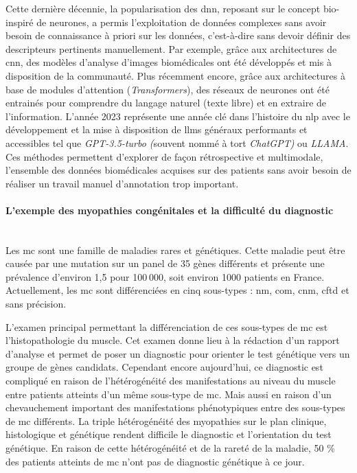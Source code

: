 Cette dernière décennie, la popularisation des \gls{dnn}, reposant sur le concept bio-inspiré de neurones, a permis l’exploitation de données complexes sans avoir besoin de connaissance à priori sur les données, c’est-à-dire sans devoir définir des descripteurs pertinents manuellement. Par exemple, grâce aux architectures de \gls{cnn}, des modèles d’analyse d’images biomédicales ont été développés et mis à disposition de la communauté. Plus récemment encore, grâce aux architectures à base de modules d’attention (\textit{Transformers}), des réseaux de neurones ont été entrainés pour comprendre du langage naturel (texte libre) et en extraire de l’information. L’année 2023 représente une année clé dans l’histoire du \gls{nlp} avec le développement et la mise à disposition de \gls{llms} généraux performants et accessibles tel que \textit{GPT-3.5-turbo (}souvent nommé à tort \textit{ChatGPT)} ou \textit{LLAMA}. Ces méthodes permettent d’explorer de façon rétrospective et multimodale, l’ensemble des données biomédicales acquises sur des patients sans avoir besoin de réaliser un travail manuel d’annotation trop important.

\paragraph{\textbf{L’exemple des myopathies congénitales et la difficulté du diagnostic}}\mbox{}\\

Les \gls{mc} sont une famille de maladies rares et génétiques. Cette maladie peut être causée par une mutation sur un panel de 35 gènes différents et présente une prévalence d’environ 1,5 pour 100 000, soit environ 1000 patients en France. Actuellement, les \gls{mc} sont différenciées en cinq sous-types : \gls{nm}, \gls{com}, \gls{cnm}, \gls{cftd} et sans précision.

L’examen principal permettant la différenciation de ces sous-types de \gls{mc} est l’histopathologie du muscle. Cet examen donne lieu à la rédaction d’un rapport d’analyse et permet de poser un diagnostic pour orienter le test génétique vers un groupe de gènes candidats. Cependant encore aujourd’hui, ce diagnostic est compliqué en raison de l’hétérogénéité des manifestations au niveau du muscle entre patients atteints d’un même sous-type de \gls{mc}. Mais aussi en raison d’un chevauchement important des manifestations phénotypiques entre des sous-types de \gls{mc} différents. La triple hétérogénéité des myopathies sur le plan clinique, histologique et génétique rendent difficile le diagnostic et l’orientation du test génétique. En raison de cette hétérogénéité et de la rareté de la maladie, 50 \% des patients atteints de \gls{mc} n’ont pas de diagnostic génétique à ce jour. 

